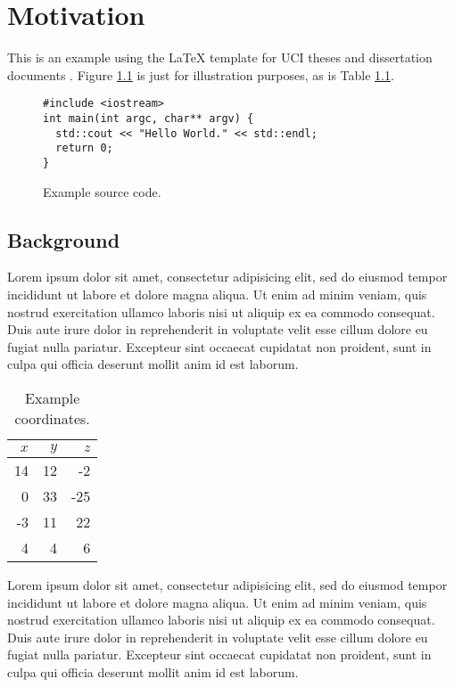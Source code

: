 \chapter{Motivation}

This is an example using the \LaTeX{} template for UCI theses and
dissertation documents \cite{uci-thesis-latex}. Figure
\ref{fig:sourcecode} is just for illustration purposes, as is Table
\ref{tab:coordinates}.

\begin{figure}
\begin{verbatim}
#include <iostream>
int main(int argc, char** argv) {
  std::cout << "Hello World." << std::endl;
  return 0;
}
\end{verbatim}
  \caption{Example source code.}
  \label{fig:sourcecode}
\end{figure}

\section{Background}

Lorem ipsum dolor sit amet, consectetur adipisicing elit, sed do
eiusmod tempor incididunt ut labore et dolore magna aliqua. Ut enim ad
minim veniam, quis nostrud exercitation ullamco laboris nisi ut
aliquip ex ea commodo consequat. Duis aute irure dolor in
reprehenderit in voluptate velit esse cillum dolore eu fugiat nulla
pariatur. Excepteur sint occaecat cupidatat non proident, sunt in
culpa qui officia deserunt mollit anim id est laborum.

\begin{table}
  \centering
  \begin{tabular}{|rr|r|}
    \hline
    $x$ & $y$ & $z$ \\
    \hline
    14 & 12 & -2 \\
    0 & 33 & -25 \\
    -3 & 11 & 22 \\
    4 & 4 & 6 \\
    \hline
  \end{tabular}
  \caption{Example coordinates.}
  \label{tab:coordinates}
\end{table}

Lorem ipsum dolor sit amet, consectetur adipisicing elit, sed do
eiusmod tempor incididunt ut labore et dolore magna aliqua. Ut enim ad
minim veniam, quis nostrud exercitation ullamco laboris nisi ut
aliquip ex ea commodo consequat. Duis aute irure dolor in
reprehenderit in voluptate velit esse cillum dolore eu fugiat nulla
pariatur. Excepteur sint occaecat cupidatat non proident, sunt in
culpa qui officia deserunt mollit anim id est laborum.


